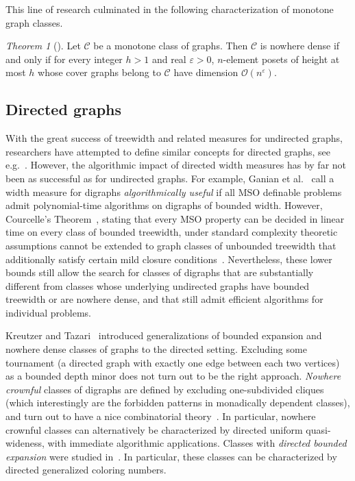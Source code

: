 \documentclass[1p,number,a4paper]{elsarticle}
\theoremstyle{remark}
\newcommand{\Oof}{\mathcal{O}}
\newcommand{\Cc}{\mathscr{C}}
\renewcommand{\epsilon}{\varepsilon}
\newtheorem{theorem}{Theorem}[section]
\begin{document}
This line of research culminated in the following characterization of monotone graph classes. 

\begin{theorem}[\cite{joret2019nowhere}]
    Let $\Cc$ be a monotone class of graphs. Then $\Cc$ is nowhere dense if and only if for every integer $h>1$ and real $\epsilon>0$, $n$-element posets of height at most $h$ whose cover graphs belong to $\Cc$ have dimension $\Oof(n^\epsilon)$. 
\end{theorem}

\subsection{Directed graphs}

With the great success of treewidth and related measures for undirected graphs, researchers have attempted to define similar concepts for directed graphs, see e.g.~\cite{barat2006directed,berwanger2006dag,ganian2009digraph,
hunter2008digraph,obdrvzalek2006dag,safari2005d}. 
However, the algorithmic impact of directed width measures has by far not been as successful as for undirected graphs. 
For example, Ganian et al.~\cite{ganian2010there} call a width measure for digraphs \emph{algorithmically useful} if all MSO definable problems admit polynomial-time algorithms on digraphs of bounded width. 
However, Courcelle's 
Theorem~\cite{Courcelle90}, stating that every MSO
property can be decided in linear time on every class of
bounded treewidth, under standard complexity theoretic
assumptions cannot be extended to graph classes
of unbounded treewidth that additionally satisfy certain 
mild closure conditions~\cite{ganian2010there, kreutzer2010lower}. 
Nevertheless, these lower bounds still allow the search for 
classes of digraphs that are substantially different from 
classes whose underlying undirected graphs have bounded
treewidth or are nowhere dense, and that still admit 
efficient algorithms for individual problems. 

Kreutzer and Tazari~\cite{kreutzer2012directed} introduced generalizations of bounded expansion and nowhere dense classes of graphs to the directed setting. 
Excluding some tournament (a directed graph with exactly one edge between each two vertices) as a bounded depth minor does not turn out to be the right approach. 
\emph{Nowhere crownful} classes of digraphs are defined by excluding one-subdivided cliques (which interestingly are the forbidden patterns in monadically dependent classes), and turn out to have a nice combinatorial theory~\cite{kreutzer2012directed}.  
In particular, nowhere crownful classes can alternatively be characterized by directed uniform quasi-wideness, with immediate algorithmic applications. 
Classes with \emph{directed bounded expansion} were studied in~\cite{kreutzer2017structural,KreutzerMMRS19}. 
In particular, these classes can be characterized by directed generalized coloring numbers. 
\end{document}
